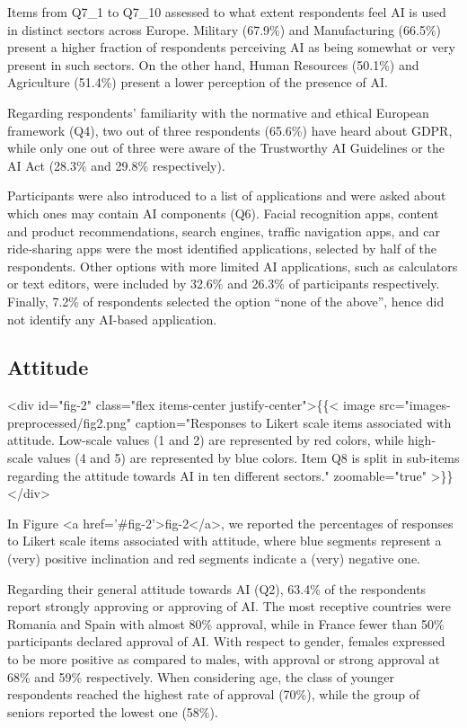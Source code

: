\documentclass{article}
\begin{document}
Items from Q7\_1 to Q7\_10 assessed to what extent respondents feel AI is used in distinct sectors across Europe.
Military (67.9\%) and Manufacturing (66.5\%) present a higher fraction of respondents perceiving AI as being somewhat or very present in such sectors. On the other hand, Human Resources (50.1\%) and Agriculture (51.4\%) present a lower perception of the presence of AI. 

Regarding respondents' familiarity with the normative and ethical European framework (Q4), two out of three respondents (65.6\%) have heard about GDPR, while only one out of three were aware of the Trustworthy AI Guidelines or the AI Act (28.3\% and 29.8\% respectively).

Participants were also introduced to a list of applications and were asked about which ones may contain AI components (Q6). Facial recognition apps, content and product recommendations, search engines, traffic navigation apps, and car ride-sharing apps were the most identified applications, selected by half of the respondents. Other options with more limited AI applications, such as calculators or text editors, were included by 32.6\% and 26.3\% of participants respectively. Finally, 7.2\% of respondents selected the option ``none of the above'', hence did not identify any AI-based application.

\subsection{Attitude}

<div id="fig-2" class="flex items-center justify-center">\{\{< image src="images-preprocessed/fig2.png" caption="Responses to Likert scale items associated with attitude. Low-scale values (1 and 2) are represented by red colors, while high-scale values (4 and 5) are represented by blue colors. Item Q8 is split in sub-items regarding the attitude towards AI in ten different sectors." zoomable="true" >\}\}</div>


In Figure <a href='#fig-2'>fig-2</a>, we reported the percentages of responses to Likert scale items associated with attitude, where blue segments represent a (very) positive inclination and red segments indicate a (very) negative one.

Regarding their general attitude towards AI (Q2), 63.4\% of the respondents report strongly approving or approving of AI.
The most receptive countries were Romania and Spain with almost 80\% approval, while in France fewer than 50\% participants declared approval of AI. With respect to gender, females expressed to be more positive as compared to males, with approval or strong approval at 68\% and 59\% respectively. When considering age, the class of younger respondents reached the highest rate of approval (70\%), while the group of seniors reported the lowest one (58\%).
\end{document}
